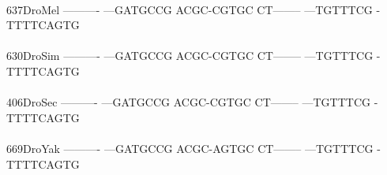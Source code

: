 \documentclass[11pt,twoside,reqno,a4paper]{article}
\begin{document}
{\\
637\hspace*{2\charwidth}DroMel	----------	---GATGCCG	ACGC-CGTGC	CT--------	---TGTTTCG	-TTTTCAGTG	\\
\hspace*{5\charwidth}\hspace*{7\charwidth}\hspace*{1\charwidth}\hspace*{1\charwidth}\hspace*{1\charwidth}\hspace*{1\charwidth}\hspace*{1\charwidth}\hspace*{1\charwidth}\\
630\hspace*{2\charwidth}DroSim	----------	---GATGCCG	ACGC-CGTGC	CT--------	---TGTTTCG	-TTTTCAGTG	\\
\hspace*{5\charwidth}\hspace*{7\charwidth}\hspace*{1\charwidth}\hspace*{1\charwidth}\hspace*{1\charwidth}\hspace*{1\charwidth}\hspace*{1\charwidth}\hspace*{1\charwidth}\\
406\hspace*{2\charwidth}DroSec	----------	---GATGCCG	ACGC-CGTGC	CT--------	---TGTTTCG	-TTTTCAGTG	\\
\hspace*{5\charwidth}\hspace*{7\charwidth}\hspace*{1\charwidth}\hspace*{1\charwidth}\hspace*{1\charwidth}\hspace*{1\charwidth}\hspace*{1\charwidth}\hspace*{1\charwidth}\\
669\hspace*{2\charwidth}DroYak	----------	---GATGCCG	ACGC-AGTGC	CT--------	---TGTTTCG	-TTTTCAGTG	\\
\hspace*{5\charwidth}\hspace*{7\charwidth}\hspace*{1\charwidth}\hspace*{1\charwidth}\hspace*{1\charwidth}\hspace*{1\charwidth}\hspace*{1\charwidth}\hspace*{1\charwidth}\\
}
\end{document}
